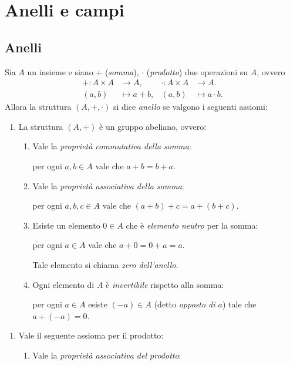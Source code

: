 \chapter{Anelli e campi}

\section{Anelli}

\begin{definition}
    [Anello]
    Sia $A$ un insieme e siano $+$ (\emph{somma}), $\cdot$ (\emph{prodotto}) due operazioni su $A$, ovvero \begin{align*}
        + : A \times A &\to A, & \cdot : A \times A &\to A. \\
        (a, b) &\mapsto a+b,      &             (a, b) &\mapsto a\cdot b.
    \end{align*} Allora la struttura $(A, +, \cdot)$ si dice \emph{anello} se valgono i seguenti assiomi:
    \begin{enumerate}[label={(S)}]
        \item La struttura $(A, +)$ è un gruppo abeliano, ovvero: 
        \begin{enumerate}[label={(S\arabic*)}]
            \item \label{def:anello_sum:com} Vale la \emph{proprietà commutativa della somma}:
        
            per ogni $a, b \in A$ vale che $a + b = b + a$.
            \item \label{def:anello_sum:ass} Vale la \emph{proprietà associativa della somma}:
            
            per ogni $a, b, c \in A$ vale che $(a + b) + c = a + (b + c)$.
            \item \label{def:anello_sum:neu} Esiste un elemento $0 \in A$ che è \emph{elemento neutro} per la somma:
            
            per ogni $a \in A$ vale che $a + 0 = 0 + a = a$.

            Tale elemento si chiama \emph{zero dell'anello}.
            \item \label{def:anello_sum:opp} Ogni elemento di $A$ è \emph{invertibile} rispetto alla somma:
            
            per ogni $a \in A$ esiste $(-a) \in A$ (detto \emph{opposto di $a$}) tale che $a + (-a) = 0$.
        \end{enumerate}
    \end{enumerate}
    \begin{enumerate}[label={(P)}]
        \item Vale il seguente assioma per il prodotto:
        \begin{enumerate}[label={(P\arabic*)}]
            \item \label{def:anello_prod:ass} Vale la \emph{proprietà associativa del prodotto}:
            

\end{enumerate}
\end{enumerate}
\end{definition}
